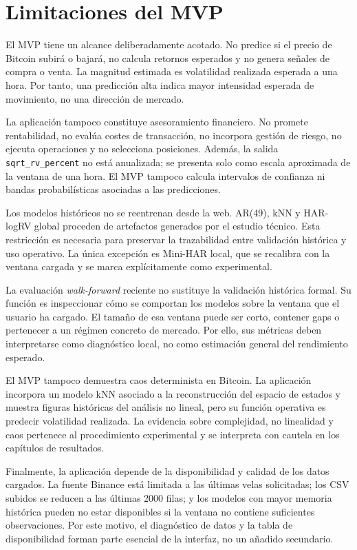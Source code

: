 \section{Limitaciones del MVP}\label{sec:limitaciones-mvp}

El MVP tiene un alcance deliberadamente acotado. No predice si el precio de Bitcoin subirá o bajará, no calcula retornos esperados y no genera señales de compra o venta. La magnitud estimada es volatilidad realizada esperada a una hora. Por tanto, una predicción alta indica mayor intensidad esperada de movimiento, no una dirección de mercado.

La aplicación tampoco constituye asesoramiento financiero. No promete rentabilidad, no evalúa costes de transacción, no incorpora gestión de riesgo, no ejecuta operaciones y no selecciona posiciones. Además, la salida \texttt{sqrt\_\allowbreak rv\_\allowbreak percent} no está anualizada; se presenta solo como escala aproximada de la ventana de una hora. El MVP tampoco calcula intervalos de confianza ni bandas probabilísticas asociadas a las predicciones.

Los modelos históricos no se reentrenan desde la web. AR(49), kNN y HAR-logRV global proceden de artefactos generados por el estudio técnico. Esta restricción es necesaria para preservar la trazabilidad entre validación histórica y uso operativo. La única excepción es Mini-HAR local, que se recalibra con la ventana cargada y se marca explícitamente como experimental.

La evaluación \textit{walk-forward} reciente no sustituye la validación histórica formal. Su función es inspeccionar cómo se comportan los modelos sobre la ventana que el usuario ha cargado. El tamaño de esa ventana puede ser corto, contener gaps o pertenecer a un régimen concreto de mercado. Por ello, sus métricas deben interpretarse como diagnóstico local, no como estimación general del rendimiento esperado.

El MVP tampoco demuestra caos determinista en Bitcoin. La aplicación incorpora un modelo kNN asociado a la reconstrucción del espacio de estados y muestra figuras históricas del análisis no lineal, pero su función operativa es predecir volatilidad realizada. La evidencia sobre complejidad, no linealidad y caos pertenece al procedimiento experimental y se interpreta con cautela en los capítulos de resultados.

Finalmente, la aplicación depende de la disponibilidad y calidad de los datos cargados. La fuente Binance está limitada a las últimas velas solicitadas; los CSV subidos se reducen a las últimas 2000 filas; y los modelos con mayor memoria histórica pueden no estar disponibles si la ventana no contiene suficientes observaciones. Por este motivo, el diagnóstico de datos y la tabla de disponibilidad forman parte esencial de la interfaz, no un añadido secundario.
